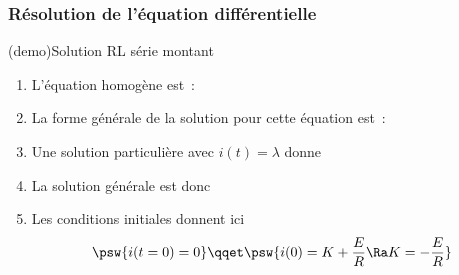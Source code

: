 \documentclass[../../main/main.tex]{subfiles}
\begin{document}
\subsubsection{Résolution de l'équation différentielle}
\begin{tcb}[label=demo:rlsolu](demo){Solution RL série montant}
	\begin{enumerate}[label=\sqenumi]
		\item L'équation homogène est~:
		      \psw{
			      \[
				      \dv{i}{t} + \frac{1}{\tau}i = 0
			      \]
		      }
		      \vspace{-15pt}
		\item La forme générale de la solution pour cette équation est~:
		      \psw{
			      \[
				      i(t) = K\exp\left( -\frac{t}{\tau} \right)
			      \]
		      }
		      \vspace{-15pt}
		\item Une solution particulière avec $i(t) = \lambda$ donne
		\item La solution générale est donc
		      \psw{
			      \[
				      i(t) = \frac{E}{R} + K\exp \left( - \frac{t}{\tau} \right)
			      \]
		      }
		      \vspace{-15pt}
		\item Les conditions initiales donnent ici
		      \[
			      \psw{i(t=0) = 0}
			      \qqet
			      \psw{i(0) = K + \frac{E}{R} \Ra K=-\frac{E}{R}}
		      \]
	\end{enumerate}
\end{tcb}
\end{document}
